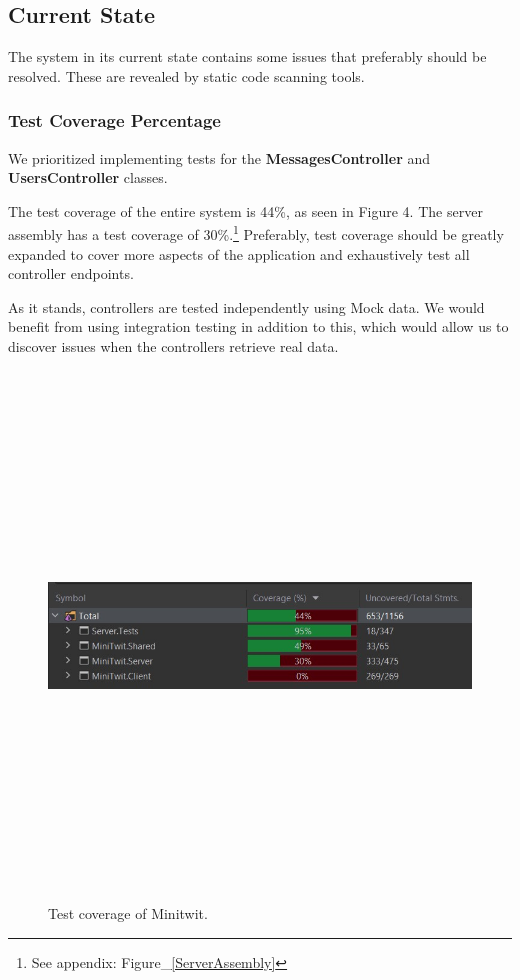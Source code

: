\subsection{Current State}

The system in its current state contains some issues that preferably should be resolved. These are revealed by static code scanning tools.


\subsubsection{Test Coverage Percentage}
We prioritized implementing tests for the \textbf{MessagesController} and \textbf{UsersController} classes.

The test coverage of the entire system is 44\%, as seen in Figure 4. The server assembly has a test coverage of 30\%.\footnote{See appendix: Figure\_\ref{ServerAssembly}} Preferably, test coverage should be greatly expanded to cover more aspects of the application and exhaustively test all controller endpoints.

As it stands, controllers are tested independently using Mock data. We would benefit from using integration testing in addition to this, which would allow us to discover issues when the controllers retrieve real data.

\begin{figure}[H]
    \centering
    \includegraphics[width=16cm,height=14cm,keepaspectratio]{Diagrams/test coverage.jpg}
    \caption{Test coverage of Minitwit.}
    \label{ComponentDiagram_1}
\end{figure}

